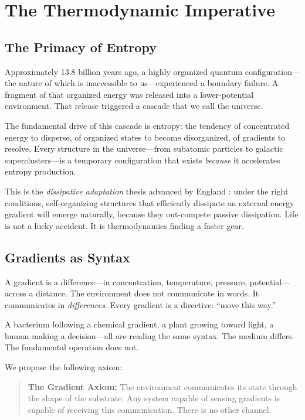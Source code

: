 \documentclass[11pt,a4paper]{article}
\begin{document}
\section{The Thermodynamic Imperative}

\subsection{The Primacy of Entropy}

Approximately 13.8 billion years ago, a highly organized quantum configuration---the nature of which is inaccessible to us---experienced a boundary failure. A fragment of that organized energy was released into a lower-potential environment. That release triggered a cascade that we call the universe.

The fundamental drive of this cascade is entropy: the tendency of concentrated energy to disperse, of organized states to become disorganized, of gradients to resolve. Every structure in the universe---from subatomic particles to galactic superclusters---is a temporary configuration that exists \emph{because} it accelerates entropy production.

This is the \emph{dissipative adaptation} thesis advanced by England \cite{england2013, england2015}: under the right conditions, self-organizing structures that efficiently dissipate an external energy gradient will emerge naturally, because they out-compete passive dissipation. Life is not a lucky accident. It is thermodynamics finding a faster gear.

\subsection{Gradients as Syntax}

A gradient is a difference---in concentration, temperature, pressure, potential---across a distance. The environment does not communicate in words. It communicates in \emph{differences}. Every gradient is a directive: ``move this way.''

A bacterium following a chemical gradient, a plant growing toward light, a human making a decision---all are reading the same syntax. The medium differs. The fundamental operation does not.

We propose the following axiom:

\begin{quote}
\textbf{The Gradient Axiom:} The environment communicates its state through the shape of the substrate. Any system capable of sensing gradients is capable of receiving this communication. There is no other channel.
\end{quote}
\end{document}

